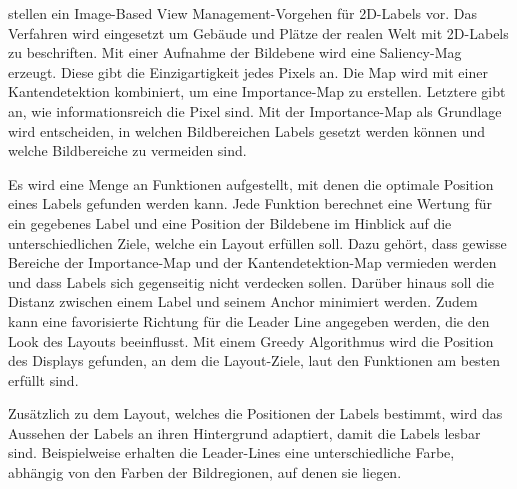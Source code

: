 \citep{viewManagementGrasset} stellen ein Image-Based View Management-Vorgehen für 2D-Labels vor. Das Verfahren wird eingesetzt um Gebäude und Plätze der realen Welt mit 2D-Labels zu beschriften. Mit einer Aufnahme der Bildebene wird eine Saliency-Mag erzeugt. Diese gibt die Einzigartigkeit jedes Pixels an. Die Map wird mit einer Kantendetektion kombiniert, um eine Importance-Map zu erstellen. Letztere gibt an, wie informationsreich die Pixel sind. Mit der Importance-Map als Grundlage wird entscheiden, in welchen Bildbereichen Labels gesetzt werden können und welche Bildbereiche zu vermeiden sind.

Es wird eine Menge an Funktionen aufgestellt, mit denen die optimale Position eines Labels gefunden werden kann. Jede Funktion berechnet eine Wertung für ein gegebenes Label und eine Position der Bildebene im Hinblick auf die unterschiedlichen Ziele, welche ein Layout erfüllen soll. Dazu gehört, dass gewisse Bereiche der Importance-Map und der Kantendetektion-Map vermieden werden und dass Labels sich gegenseitig nicht verdecken sollen. Darüber hinaus soll die Distanz zwischen einem Label und seinem Anchor minimiert werden. Zudem kann eine favorisierte Richtung für die Leader Line angegeben werden, die den Look des Layouts beeinflusst. Mit einem Greedy Algorithmus wird die Position des Displays gefunden, an dem die Layout-Ziele, laut den Funktionen am besten erfüllt sind.


Zusätzlich zu dem Layout, welches die Positionen der Labels bestimmt, wird das Aussehen der Labels an ihren Hintergrund adaptiert, damit die Labels lesbar sind. Beispielweise erhalten die Leader-Lines eine unterschiedliche Farbe, abhängig von den Farben der Bildregionen, auf denen sie liegen.\cite{viewManagementGrasset} %


